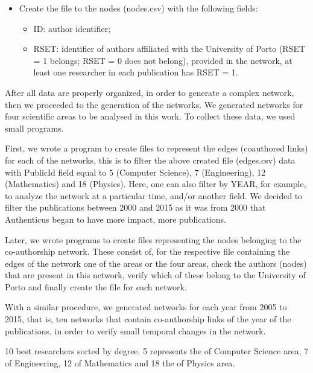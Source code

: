 \documentclass{article}
\begin{document}
\begin{multicols}{2}
\begin{itemize}
\begin{itemize}
\item Create the file to the nodes (nodes.csv) with the following fields:
\begin{itemize}
\item ID: author identifier;
\item RSET: identifier of authors affiliated with the University of Porto (RSET = 1 belongs; RSET = 0 does not belong), provided in the network, at least one researcher in each publication has RSET = 1.
\end{itemize}
\end{itemize}
 
\end{itemize}

After all data are properly organized, in order to generate a complex network, then we proceeded to the generation of the networks. We generated networks for four scientific areas to be analysed in this work. To collect these data, we used small programs.

First, we wrote a program to create files to represent the edges (coauthored links) for each of the networks, this is to filter the above created file (edges.csv) data with PublicId field equal to 5 (Computer Science), 7 (Engineering), 12 (Mathematics) and 18 (Physics). Here, one can also filter by YEAR, for example, to analyze the network at a particular time, and/or another field. We decided to filter the publications between 2000 and 2015 as it was from 2000 that Authenticus began to have more impact, more publications.

Later, we wrote programs to create files representing the nodes belonging to the co-authorship network. These consist of, for the respective file containing the edges of the network one of the areas or the four areas, check the authors (nodes) that are present in this network, verify which of these belong to the University of Porto and finally create the file for each network.

With a similar procedure, we generated networks for each year from 2005 to 2015, that is, ten networks that contain co-authorship links of the year of the publications, in order to verify small temporal changes in the network.

\begin{table}[ht]
    \begin{minipage}[b]{0.5\linewidth}
        \caption{10 best researchers sorted by degree. 5 represents the of Computer Science area, 7 of Engineering, 12 of Mathematics and 18 the of Physics area. \label{tab:table1}}
        \centering
        

\end{minipage}
\end{table}
\end{multicols}
\end{document}
